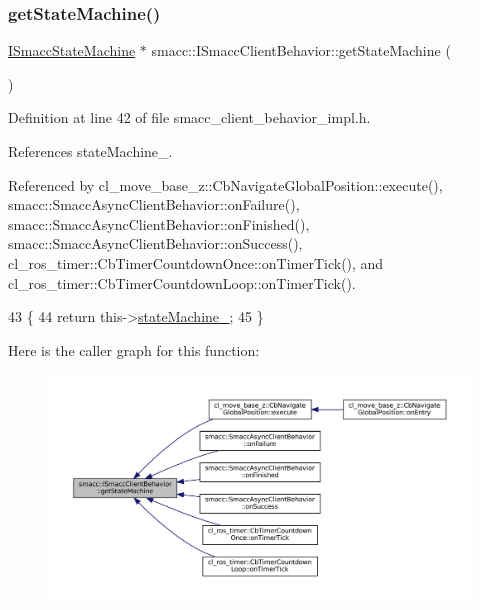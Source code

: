 \subsubsection{\texorpdfstring{get\+State\+Machine()}{getStateMachine()}}
{\footnotesize\ttfamily \hyperlink{classsmacc_1_1ISmaccStateMachine}{I\+Smacc\+State\+Machine} $\ast$ smacc\+::\+I\+Smacc\+Client\+Behavior\+::get\+State\+Machine (\begin{DoxyParamCaption}{ }\end{DoxyParamCaption})\hspace{0.3cm}{\ttfamily [inline]}}



Definition at line 42 of file smacc\+\_\+client\+\_\+behavior\+\_\+impl.\+h.



References state\+Machine\+\_\+.



Referenced by cl\+\_\+move\+\_\+base\+\_\+z\+::\+Cb\+Navigate\+Global\+Position\+::execute(), smacc\+::\+Smacc\+Async\+Client\+Behavior\+::on\+Failure(), smacc\+::\+Smacc\+Async\+Client\+Behavior\+::on\+Finished(), smacc\+::\+Smacc\+Async\+Client\+Behavior\+::on\+Success(), cl\+\_\+ros\+\_\+timer\+::\+Cb\+Timer\+Countdown\+Once\+::on\+Timer\+Tick(), and cl\+\_\+ros\+\_\+timer\+::\+Cb\+Timer\+Countdown\+Loop\+::on\+Timer\+Tick().


\begin{DoxyCode}
43 \{
44     \textcolor{keywordflow}{return} this->\hyperlink{classsmacc_1_1ISmaccClientBehavior_a0fea65db292a8bb3dfba3e5840491d79}{stateMachine\_};
45 \}
\end{DoxyCode}
Here is the caller graph for this function\+:
\nopagebreak
\begin{figure}[H]
\begin{center}
\leavevmode
\includegraphics[width=350pt]{classsmacc_1_1ISmaccClientBehavior_a9d55a85bf0a920033805a3c050de2019_icgraph}
\end{center}
\end{figure}
\mbox{\label{classsmacc_1_1ISmaccClientBehavior_a3ec24a839087c550e1d62a81e48cf530}} 
